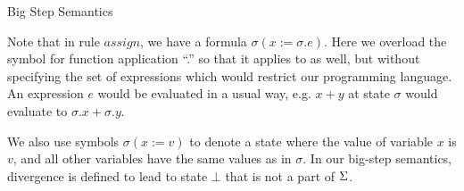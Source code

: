 \newcommand\ddfrac[2]{\frac{\displaystyle #1}{\displaystyle #2}}
\begin{table}[t]
  \normalsize
  \centering
  \caption{Big Step Semantics}
  \label{tab:big-step}
\end{table}

Note that in rule $assign$, we have a formula $\sigma(x:=\sigma.e)$. 
Here we overload the symbol for function application ``.'' so that it applies to  as well, but without specifying the set of expressions which would restrict our programming language. 
An expression $e$ would be evaluated in a usual way, e.g. $x+y$ at state $\sigma$ would evaluate to $\sigma.x + \sigma.y$. 

We also use symbols $\sigma(x:=v)$ to denote a state where the value of variable $x$ is $v$, and all other variables have the same values as in $\sigma$.
In our big-step semantics, divergence is defined to lead to state $\bot$ that is not a part of $\S$. 

